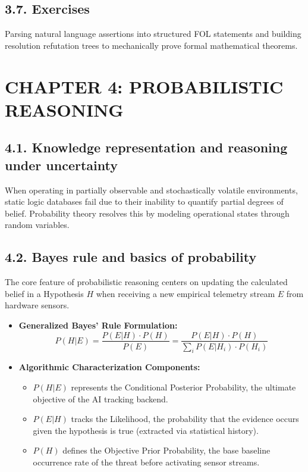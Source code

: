 \documentclass[11pt,a4paper]{article}
\begin{document}
\subsection{3.7. Exercises}
Parsing natural language assertions into structured FOL statements and building resolution refutation trees to mechanically prove formal mathematical theorems.

\section{CHAPTER 4: PROBABILISTIC REASONING}

\subsection{4.1. Knowledge representation and reasoning under uncertainty}
When operating in partially observable and stochastically volatile environments, static logic databases fail due to their inability to quantify partial degrees of belief. Probability theory resolves this by modeling operational states through random variables.

\subsection{4.2. Bayes rule and basics of probability}
The core feature of probabilistic reasoning centers on updating the calculated belief in a Hypothesis $H$ when receiving a new empirical telemetry stream $E$ from hardware sensors.
\begin{itemize}
    \item \textbf{Generalized Bayes' Rule Formulation:}
    \begin{equation}
        P(H | E) = \frac{P(E | H) \cdot P(H)}{P(E)} = \frac{P(E | H) \cdot P(H)}{\sum_{i} P(E | H_i) \cdot P(H_i)}
    \end{equation}
    \item \textbf{Algorithmic Characterization Components:}
    \begin{itemize}
        \item $P(H | E)$ represents the Conditional Posterior Probability, the ultimate objective of the AI tracking backend.
        \item $P(E | H)$ tracks the Likelihood, the probability that the evidence occurs given the hypothesis is true (extracted via statistical history).
        \item $P(H)$ defines the Objective Prior Probability, the base baseline occurrence rate of the threat before activating sensor streams.
    \end{itemize}
\end{itemize}
\end{document}
